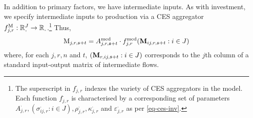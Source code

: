 \documentclass[12pt,a4paper,twoside, draft]{article}
\begin{document}
In addition to primary factors, we have intermediate inputs.
As with investment, we specify intermediate inputs to production via a CES
aggregator $f_{j, r}^{\textup{M}}: \nnreal^{J} \rightarrow
\nnreal$.\footnote{
  The superscript in $f_{j, r}^{\cdot}$ indexes the variety of CES
  aggregators in the model.
  Each function $f_{j, r}^{\cdot}$ is characterised by a corresponding
  set of parameters
  $A_{j, r}^{\cdot}, (\sigma_{ij, r}^{\cdot}: i \in J),
  \rho_{j, r}^{\cdot}, \kappa_{j, r}^{\cdot} $ and
  $\varepsilon_{j, r}^{\cdot}$ as per \cref{eq-ces-inv}.
}
Thus,
\begin{equation}\label{eq-ces-int}
  \textup{M}_{j, r, \mathfrak{s} + t} = A_{j, r, \mathfrak{s} + t}^{\textup{med}}
    \cdot f_{j, r}^{\textup{med}}(
      \mathbf{M}_{ij, r, \mathfrak{s} + t}: i \in J
      )
\end{equation}
where, for each $j, r, n$ and $t$, $(\textbf{M}_{r,ij,\mathfrak{s} + t} : i \in J)$
corresponds to the $j$th column of a standard input-output matrix of
intermediate flows.
\end{document}
